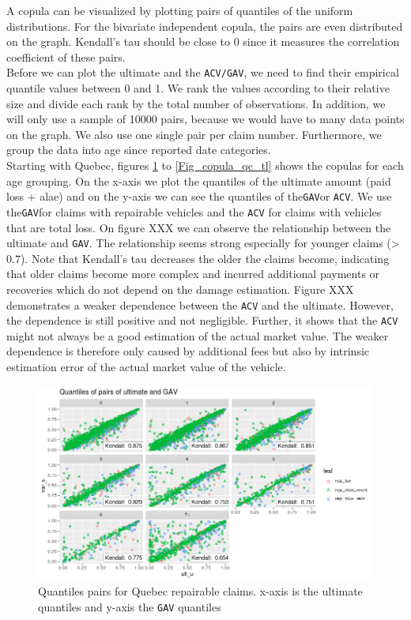 	A copula can be visualized by plotting pairs of quantiles of the uniform distributions. For the bivariate independent copula, the pairs are even distributed on the graph. Kendall’s tau should be close to 0 since it measures the correlation coefficient of these pairs. \\
	Before we can plot the ultimate and the \texttt{ACV/GAV}, we need to find their empirical quantile values between 0 and 1. We rank the values according to their relative size and divide each rank by the total number of observations. In addition, we will only use a sample of 10000 pairs, because we would have to many data points on the graph. We also use one single pair per claim number. Furthermore, we group the data into age since reported date categories. \\
	Starting with Quebec, figures \ref{Fig_copula_qc_rep} to \ref{Fig_copula_qc_tl} shows the copulas for each age grouping. On the x-axis we plot the quantiles of the ultimate amount (paid loss + alae) and on the y-axis we can see the quantiles of the\texttt{GAV}or \texttt{ACV}. We use the\texttt{GAV}for claims with repairable vehicles and the \texttt{ACV} for claims with vehicles that are total loss. On figure XXX we can observe the relationship between the ultimate and \texttt{GAV}. The relationship seems strong especially for younger claims (> 0.7). Note that Kendall’s tau decreases the older the claims become, indicating that older claims become more complex and incurred additional payments or recoveries which do not depend on the damage estimation. Figure XXX demonstrates a weaker dependence between the \texttt{ACV} and the ultimate. However, the dependence is still positive and not negligible. Further, it shows that the \texttt{ACV} might not always be a good estimation of the actual market value. The weaker dependence is therefore only caused by additional fees but also by intrinsic estimation error of the actual market value of the vehicle. 
	
	\begin{figure}[H]
		\begin{center}
			\includegraphics[scale=0.4]{Graphiques/qc_rep} 
			\renewcommand{\figurename}{Figure}
			\caption{Quantiles pairs for Quebec repairable claims. x-axis is the ultimate quantiles and y-axis the \texttt{GAV} quantiles}\label{Fig_copula_qc_rep}
		\end{center}
	\end{figure}

